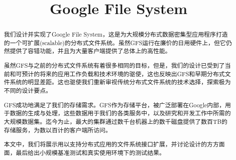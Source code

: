 \documentclass{article}
\begin{document}
\title{Google File System}
\date{}
\maketitle

\begin{abstract}
我们设计并实现了Google File System，这是为大规模分布式数据密集型应用程序打造的一个可扩展(scalable)的分布式文件系统。虽然GFS运行在廉价的日用硬件上，但它仍然提供了容错功能，并且为大量客户端提供了总体上的高性能。\par
虽然GFS与之前的分布式文件系统有着很多相同的目标，但是，我们的设计已受到了当前和可预计的将来的应用工作负载和技术环境的驱使，这也反映出GFS和早期分布式文件系统的明显差距。这也驱使我们重新审视传统分布式文件系统的技术选择，探索极为不同的设计要点。\par
GFS成功地满足了我们的存储需求。GFS作为存储平台，被广泛部署在Google内部，用于数据的生成与处理，这些数据用于我们的各类服务中，以及研究和开发工作中所需的大规模数据集。迄今为止，最大的集群通过数千台机器上的数千磁盘提供了数百TB的存储服务，为数以百计的客户端所访问。\par
本文中，我们将展示用以支持分布式应用的文件系统接口扩展，并讨论设计的方方面面，最后给出小规模基准测试和真实使用环境下的测试结果。
\end{abstract}
\end{document}
